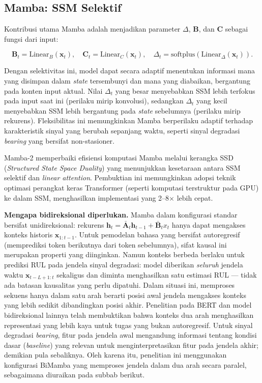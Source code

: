 \subsection{Mamba: SSM Selektif}
\label{subsec:bab3_mamba_selektif}

Kontribusi utama Mamba  adalah menjadikan parameter
$\Delta$, $\mathbf{B}$, dan $\mathbf{C}$ sebagai fungsi dari input:

\begin{equation}\label{eq:bab3_mamba_selective}
  \mathbf{B}_t = \text{Linear}_B(\mathbf{x}_t), \quad
  \mathbf{C}_t = \text{Linear}_C(\mathbf{x}_t), \quad
  \Delta_t = \text{softplus}(\text{Linear}_\Delta(\mathbf{x}_t)).
\end{equation}

Dengan selektivitas ini, model dapat secara adaptif menentukan informasi
mana yang disimpan dalam \emph{state} tersembunyi dan mana yang diabaikan,
bergantung pada konten input aktual. Nilai $\Delta_t$ yang besar menyebabkan
SSM lebih terfokus pada input saat ini (perilaku mirip konvolusi), sedangkan
$\Delta_t$ yang kecil menyebabkan SSM lebih bergantung pada \emph{state}
sebelumnya (perilaku mirip rekurens). Fleksibilitas ini memungkinkan Mamba
berperilaku adaptif terhadap karakteristik sinyal yang berubah sepanjang
waktu, seperti sinyal degradasi \emph{bearing} yang bersifat non-stasioner.

Mamba-2  memperbaiki efisiensi komputasi Mamba
melalui kerangka SSD (\emph{Structured State Space Duality}) yang menunjukkan
kesetaraan antara SSM selektif dan \emph{linear attention}. Pembuktian ini
memungkinkan adopsi teknik optimasi perangkat keras Transformer (seperti
komputasi terstruktur pada GPU) ke dalam SSM, menghasilkan implementasi yang
2--8$\times$ lebih cepat.

\textbf{Mengapa bidireksional diperlukan.} Mamba dalam konfigurasi standar
bersifat unidireksional: rekurens $\mathbf{h}_t = \bar{\mathbf{A}}_t
\mathbf{h}_{t-1} + \bar{\mathbf{B}}_t x_t$ hanya dapat mengakses konteks
historis $\mathbf{x}_{1:t-1}$. Untuk pemodelan bahasa yang bersifat
autoregresif (memprediksi token berikutnya dari token sebelumnya), sifat
kausal ini merupakan properti yang diinginkan. Namun konteks berbeda berlaku
untuk prediksi RUL pada jendela sinyal degradasi: model diberikan \emph{seluruh}
jendela waktu $\mathbf{x}_{t-L+1:t}$ sekaligus dan diminta menghasilkan satu
estimasi RUL --- tidak ada batasan kausalitas yang perlu dipatuhi. Dalam
situasi ini, memproses sekuens hanya dalam satu arah berarti posisi awal
jendela mengakses konteks yang lebih sedikit dibandingkan posisi akhir.
Penelitian pada BERT  dan model bidireksional lainnya
telah membuktikan bahwa konteks dua arah menghasilkan representasi yang
lebih kaya untuk tugas yang bukan autoregresif. Untuk sinyal degradasi
\emph{bearing}, fitur pada jendela awal mengandung informasi tentang kondisi dasar
(\emph{baseline}) yang relevan untuk menginterpretasikan fitur pada jendela
akhir; demikian pula sebaliknya. Oleh karena itu, penelitian ini menggunakan
konfigurasi BiMamba yang memproses jendela dalam dua arah secara paralel,
sebagaimana diuraikan pada subbab berikut.

